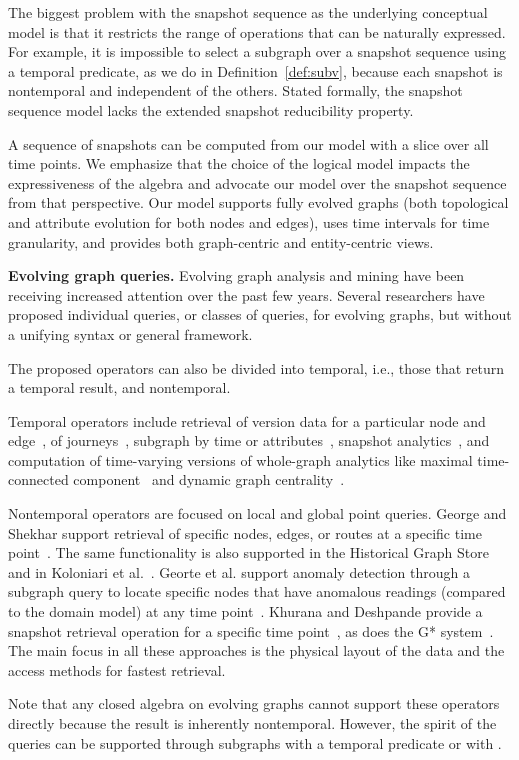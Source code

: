 The biggest problem with the snapshot sequence as the underlying
conceptual model is that it restricts the range of operations that can
be naturally expressed.  For example, it is impossible to select a
subgraph over a snapshot sequence using a temporal predicate, as we do
in Definition~\ref{def:subv}, because each snapshot is nontemporal and
independent of the others.  Stated formally, the snapshot
  sequence model lacks the extended snapshot reducibility property.

A sequence of snapshots can be computed from our model with a slice
over all time points.  We emphasize that the choice of the logical
model impacts the expressiveness of the algebra and advocate our model
over the snapshot sequence from that perspective.  Our model supports
fully evolved graphs (both topological and attribute evolution for
both nodes and edges), uses time intervals for time granularity, and
provides both graph-centric and entity-centric views.

{\bf Evolving graph queries.}  Evolving graph analysis and mining have
been receiving increased attention over the past few years.  Several
researchers have proposed individual queries, or classes of queries,
for evolving graphs, but without a unifying syntax or general
framework.

The proposed operators can also be divided into temporal, i.e., those
that return a temporal result, and nontemporal.

Temporal operators include retrieval of version data for a particular
node and edge~\cite{George2006}, of
journeys~\cite{Casteigts2011,George2009}, subgraph by time or
attributes~\cite{Huo2014,Khurana2016}, snapshot
analytics~\cite{Khurana2016,Labouseur2015,Miao2015}, and computation
of time-varying versions of whole-graph analytics like maximal
time-connected component~\cite{Ferreira2004} and dynamic graph
centrality~\cite{Lerman2010}.

Nontemporal operators are focused on local and global point queries.
George and Shekhar support retrieval of specific nodes, edges, or
routes at a specific time point~\cite{George2006}.  The same
functionality is also supported in the Historical Graph
Store~\cite{Khurana2016} and in Koloniari et al.~\cite{Koloniari2012}.
Georte et al. support anomaly detection through a subgraph query to
locate specific nodes that have anomalous readings (compared to the
domain model) at any time point~\cite{George2009}.  Khurana and
Deshpande provide a snapshot retrieval operation for a specific time
point~\cite{Khurana2013}, as does the G* system~\cite{Labouseur2015}.
The main focus in all these approaches is the physical layout of the
data and the access methods for fastest retrieval.  

Note that any closed algebra on evolving graphs cannot support these
operators directly because the result is inherently nontemporal.
However, the spirit of the queries can be supported through subgraphs
with a temporal predicate or with .
